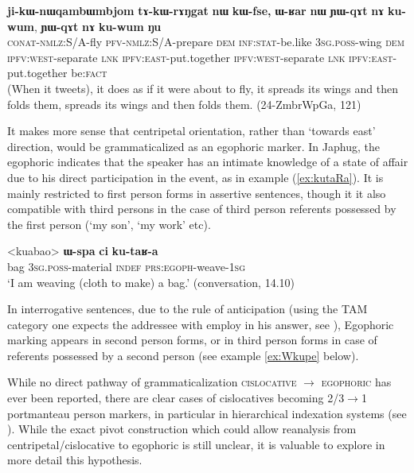 \documentclass[oldfontcommands,oneside,a4paper,11pt]{article}
\newcommand{\ipa}[1]{\mbox{\phon\textbf{#1}}} %
\begin{document}
\begin{exe}
\ex \label{ex:YWqAt}
\gll \ipa{ji-kɯ-nɯqambɯmbjom} 	\ipa{tɤ-kɯ-rɤŋgat} 	\ipa{nɯ} 	\ipa{kɯ-fse,} 	\ipa{ɯ-ʁar} 	\ipa{nɯ} 	\ipa{ɲɯ-qɤt} 	\ipa{nɤ} 	\ipa{ku-wum}, 	\ipa{ɲɯ-qɤt} 	\ipa{nɤ} 	\ipa{ku-wum} \ipa{ŋu} \\
\textsc{conat-nmlz:S/A}-fly \textsc{pfv-nmlz:S/A}-prepare \textsc{dem} \textsc{inf:stat}-be.like \textsc{3sg.poss}-wing \textsc{dem}  \textsc{ipfv:west}-separate \textsc{lnk} \textsc{ipfv:east}-put.together \textsc{ipfv:west}-separate \textsc{lnk} \textsc{ipfv:east}-put.together be:\textsc{fact} \\
\glt (When it tweets), it does as if it were about to fly, it spreads its wings and then folds them, spreads its wings and then folds them. (24-ZmbrWpGa, 121)
\end{exe}

It makes more sense that centripetal orientation, rather than `towards east' direction, would be grammaticalized as an egophoric marker. In Japhug, the egophoric indicates that the speaker has an  intimate knowledge of a state of affair due to his direct participation in the event, as in example (\ref{ex:kutaRa}). It is mainly restricted to first person forms in assertive sentences, though it it also compatible with third persons in the case of third person referents possessed by the first person (`my son', `my work' etc). 

\begin{exe}
\ex \label{ex:kutaRa}
\gll 
<kuabao> 	\ipa{ɯ-spa}  	\ipa{ci}  	\ipa{ku-taʁ-a}  \\
bag \textsc{3sg.poss}-material \textsc{indef} \textsc{prs:egoph}-weave-\textsc{1sg} \\
\glt `I am weaving (cloth to make) a bag.' (conversation, 14.10)
\end{exe}

In interrogative sentences, due to the rule of anticipation (using the TAM category one expects the addressee with employ in his answer, see \citealt{tournadre14evidentiality}), Egophoric marking appears in second person forms, or in third person forms in case of referents possessed by a second person (see example \ref{ex:Wkupe} below).

While no direct pathway of grammaticalization \textsc{cislocative} $\rightarrow$ \textsc{egophoric} has ever been reported, there are clear cases of cislocatives becoming 2/3$\rightarrow$1 portmanteau person markers, in particular in hierarchical indexation systems (see \citealt{jacques14inverse}). While the exact pivot construction which could allow reanalysis from centripetal/cislocative to egophoric is still unclear, it is valuable to explore in more detail this hypothesis.
\end{document}
